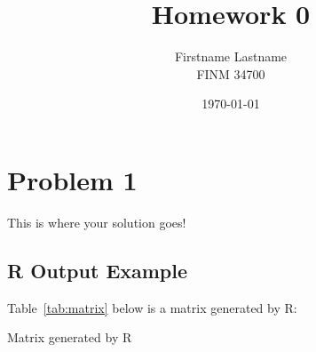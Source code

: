 \documentclass[12pt]{article}
\title{Homework 0}
\author{Firstname Lastname \\ FINM 34700}
\date{\vspace{0.5em} \today}
\begin{document}
\maketitle


\section*{Problem 1}
This is where your solution goes!

\subsection*{R Output Example}
Table~\ref{tab:matrix} below is a matrix generated by R:

\begin{table}[h!]
  \centering
  \caption{Matrix generated by R}
  \label{tab:matrix}
  
\end{table}
\end{document}
